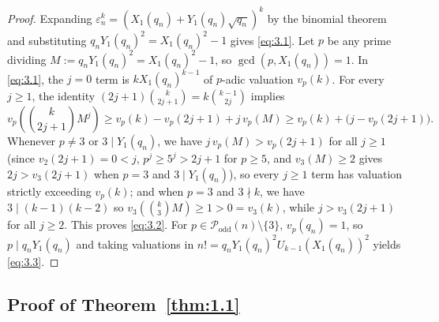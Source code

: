 \documentclass[11pt,reqno]{amsart}
\theoremstyle{remark}
\numberwithin{equation}{section}
\newcommand{\Podd}{\mathcal{P}_{\mathrm{odd}}}
\begin{document}
\begin{proof}
Expanding $\varepsilon_n^k = (X_1(q_n) + Y_1(q_n)\sqrt{q_n})^k$ by the binomial theorem and substituting $q_n Y_1(q_n)^2 = X_1(q_n)^2 - 1$ gives \eqref{eq:3.1}. Let $p$ be any prime dividing $M := q_n Y_1(q_n)^2 = X_1(q_n)^2 - 1$, so $\gcd(p, X_1(q_n)) = 1$. In \eqref{eq:3.1}, the $j = 0$ term is $k X_1(q_n)^{k-1}$ of $p$-adic valuation $v_p(k)$. For every $j \ge 1$, the identity $(2j + 1)\binom{k}{2j+1} = k\binom{k-1}{2j}$ implies
\[
v_p\!\left(\binom{k}{2j + 1}M^j\right) \ge v_p(k) - v_p(2j + 1) + j\,v_p(M) \ge v_p(k) + \bigl(j - v_p(2j + 1)\bigr).
\]
Whenever $p \ne 3$ or $3 \mid Y_1(q_n)$, we have $j\,v_p(M) > v_p(2j + 1)$ for all $j \ge 1$ (since $v_2(2j + 1) = 0 < j$, $p^j \ge 5^j > 2j + 1$ for $p \ge 5$, and $v_3(M) \ge 2$ gives $2j > v_3(2j + 1)$ when $p = 3$ and $3 \mid Y_1(q_n)$), so every $j \ge 1$ term has valuation strictly exceeding $v_p(k)$; and when $p = 3$ and $3 \nmid k$, we have $3 \mid (k - 1)(k - 2)$ so $v_3(\binom{k}{3}M) \ge 1 > 0 = v_3(k)$, while $j > v_3(2j + 1)$ for all $j \ge 2$. This proves \eqref{eq:3.2}. For $p \in \Podd(n) \setminus \{3\}$, $v_p(q_n) = 1$, so $p \mid q_n Y_1(q_n)$ and taking valuations in $n! = q_n Y_1(q_n)^2 U_{k-1}(X_1(q_n))^2$ yields \eqref{eq:3.3}.
\end{proof}

\subsection{Proof of Theorem~\ref{thm:1.1}}
\end{document}
